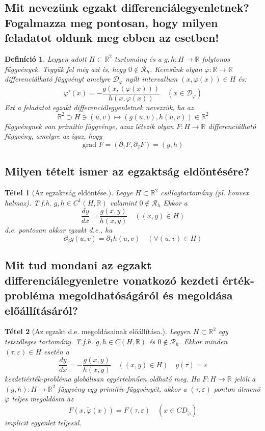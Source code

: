 \documentclass[12pt,a4paper]{article}
\newcommand{\R}{\mathbb{R}}
\newcommand{\CR}{\mathcal{R}}
\newcommand{\CD}{\mathcal{D}}
\newcommand{\f}{\varphi}
\newcommand{\tf}{\tilde{\f}}
\newcommand{\bb}[1]{\left( #1 \right)}
\newtheorem{tet}{Tétel}[section]
\newtheorem{defi}{Definíció}[section]
\begin{document}
\subsection{Mit nevezünk egzakt differenciálegyenletnek? Fogalmazza meg pontosan, hogy milyen feladatot oldunk meg ebben az esetben!}
\begin{defi}
Legyen adott $H \subset \R^2$ tartomány és a $g,h : H \to \R$ folytonos függvények. Tegyük fel még azt is, hogy $0 \notin \mathcal{R}_h$. Keresünk olyan $\f : \R \to \R$ differenciálható függvényt amelyre $\CD_\f$ nyílt intervallum $(x,\f(x)) \in H $ és:
\[
\f'(x) = -\frac{g(x,(\f(x)))}{h(x,\f(x))} \quad (x \in \CD_\f)
\]
Ezt a feladatot egzakt differenciálegyenletnek nevezzük, ha az
\[
\R^2 \supset H \ni (u,v) \mapsto (g(u,v),h(u,v)) \in \R^2
\]
függvénynek van primitív függvénye, azaz létezik olyan $F: H \to \R$ differenciálható függvény, amelyre az igaz, hogy
\[
\text{grad } F = (\partial_1F,\partial_2F) = (g,h)
\]
\end{defi}
\subsection{Milyen tételt ismer az egzaktság eldöntésére?}
\begin{tet}[Az egzaktság eldöntése.]
Legye $H \subset \R^2 $ csillagtartomány (pl. konvex halmaz). T.f.h. $g,h \in C^1 (H,\R)$ valamint $0 \notin \CR_h$ Ekkor a
\[
\frac{dy}{dx} = \frac{g(x,y)}{h(x,y)} \quad \bb{(x,y) \in H}
\] 
d.e. pontosan akkor egzakt d.e., ha
\[
\partial_2g(u,v) = \partial_1h(u,v) \quad \bb{\forall (u,v) \in H}
\]
\end{tet}
\subsection{Mit tud mondani az egzakt differenciálegyenletre vonatkozó kezdeti érték-probléma megoldhatóságáról és megoldása előállításáról?}
\begin{tet}[Az egzakt d.e. megoldásainak előállítása.]
Legyen $H \subset \R^2$ egy tetszőleges tartomány. T.f.h. $g,h \in C (H,\R)$ és $0 \notin \CR_h$. Ekkor minden $(\tau,\varepsilon) \in H $ esetén a
\[
\frac{dy}{dx} = - \frac{g(x,y)}{h(x,y)} \quad \bb{(x,y)\in H } \quad y(\tau) = \varepsilon
\]
kezdetiérték-probléma globálisan egyértelműen oldható meg. Ha $F : H \to \R $ jelöli a $(g,h) : H \to \R^2$ függvény egy primitív függvényét, akkor a $(\tau,\varepsilon)$ ponton átmenő $\tf$ teljes megoldásra az
\[
F(x,\tf(x)) = F(\tau,\varepsilon) \quad \bb{x \in CD_{\tf}}
\]
implicit egyenlet teljesül.
\end{tet}
\end{document}

